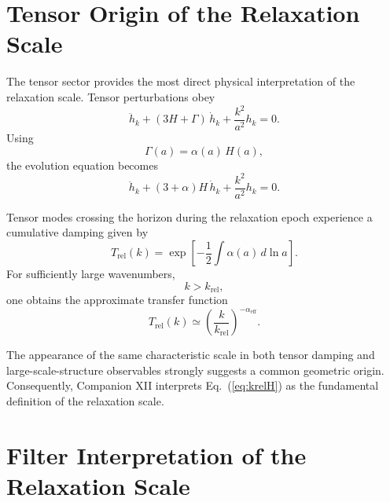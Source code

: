 \documentclass[11pt,a4paper]{article}
\begin{document}
\section{Tensor Origin of the Relaxation Scale}

The tensor sector provides the most direct physical interpretation of the
relaxation scale. Tensor perturbations obey
\begin{equation}
  \ddot{h}_{k}
  +
  (3H + \Gamma)\, \dot{h}_{k}
  +
  \frac{k^{2}}{a^{2}} h_{k}
  =
  0.
  \label{eq:tensorrel}
\end{equation}
Using
\begin{equation}
  \Gamma(a)
  =
  \alpha(a)\, H(a),
\end{equation}
the evolution equation becomes
\begin{equation}
  \ddot{h}_{k}
  +
  (3 + \alpha) H\, \dot{h}_{k}
  +
  \frac{k^{2}}{a^{2}} h_{k}
  =
  0.
\end{equation}

Tensor modes crossing the horizon during the relaxation epoch experience a
cumulative damping given by
\begin{equation}
  T_{\mathrm{rel}}(k)
  =
  \exp
  \left[
    -\frac{1}{2}
    \int \alpha(a)\, d\ln a
  \right].
\end{equation}
For sufficiently large wavenumbers,
\begin{equation}
  k > k_{\mathrm{rel}},
\end{equation}
one obtains the approximate transfer function
\begin{equation}
  T_{\mathrm{rel}}(k)
  \simeq
  \left(
    \frac{k}{k_{\mathrm{rel}}}
  \right)^{-\alpha_{\mathrm{eff}}}.
  \label{eq:Trel}
\end{equation}

The appearance of the same characteristic scale in both tensor damping and
large-scale-structure observables strongly suggests a common geometric origin.
Consequently, Companion XII interprets Eq.~(\ref{eq:krelH}) as the fundamental
definition of the relaxation scale.
\section{Filter Interpretation of the Relaxation Scale}
\end{document}
